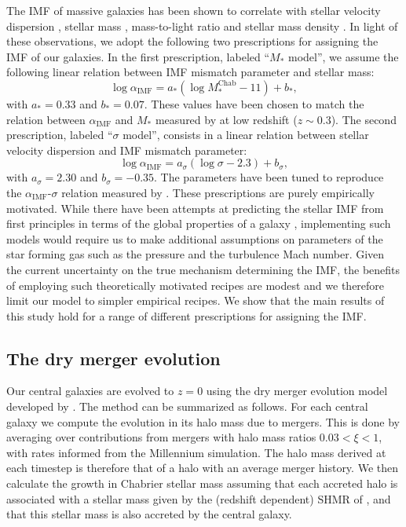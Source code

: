 \documentclass[usenatbib, letters]{mnras}
\def\mchab{M_*^{\mathrm{Chab}}}
\def\aimf{\alpha_{\mathrm{IMF}}}
\begin{document}
The IMF of massive galaxies has been shown to correlate with stellar velocity dispersion \citep[e.g.]{Tre++10, CvD12, LaB++13, Spi++14, Pos++15}, stellar mass \citep{Aug++10b, Son++15}, mass-to-light ratio \citep{Cap++12} and stellar mass density \citep{Spi++15}.
In light of these observations, we adopt the following two prescriptions for assigning the IMF of our galaxies.
In the first prescription, labeled ``$M_*$ model'', we assume the following linear relation between IMF mismatch parameter and stellar mass:
\begin{equation}\label{eq:mstarmodel}
\log{\aimf} = a_*(\log{\mchab} - 11) + b_*,
\end{equation}
with $a_* = 0.33$ and $b_* = 0.07$. These values have been chosen to match the relation between $\aimf$ and $M_*$ measured by \citet{Son++15} at low redshift ($z\sim 0.3$).
The second prescription, labeled ``$\sigma$ model'', consists in a linear relation between stellar velocity dispersion and IMF mismatch parameter:
\begin{equation}\label{eq:sigmamodel}
\log{\aimf} = a_\sigma(\log{\sigma} - 2.3) + b_\sigma,
\end{equation}
with $a_\sigma = 2.30$ and $b_\sigma = -0.35$. The parameters have been tuned to reproduce the $\aimf$-$\sigma$ relation measured by \citet{Pos++15}.
These prescriptions are purely empirically motivated. While there have been attempts at predicting the stellar IMF from first principles in terms of the global properties of a galaxy \citep[e.g.]{Kru11,Hop12}, implementing such models would require us to make additional assumptions on parameters of the star forming gas such as the pressure and the turbulence Mach number.
Given the current uncertainty on the true mechanism determining the IMF, the benefits of employing such theoretically motivated recipes are modest and we therefore limit our model to simpler empirical recipes.
We show that the main results of this study hold for a range of different prescriptions for assigning the IMF.




\subsection{The dry merger evolution}

Our central galaxies are evolved to $z=0$ using the dry merger evolution model developed by \citet{Nip++12}.
The method can be summarized as follows.
For each central galaxy we compute the evolution in its halo mass due to mergers.
This is done by averaging over contributions from mergers with halo mass ratios $0.03 < \xi < 1$, with rates informed from the Millennium simulation.
The halo mass derived at each timestep is therefore that of a halo with an average merger history.
We then calculate the growth in Chabrier stellar mass assuming that each accreted halo is associated with a stellar mass given by the (redshift dependent) SHMR of \citet{Lea++12}, and that this stellar mass is also accreted by the central galaxy.
\end{document}
